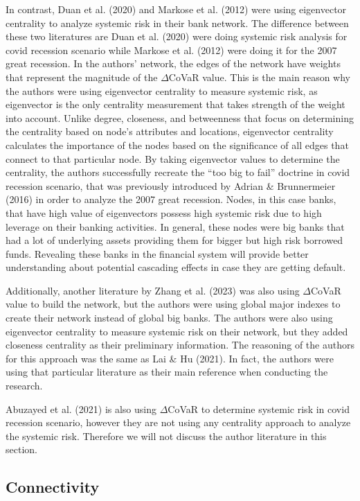 \documentclass[a4paper,11pt]{article}
\begin{document}
In contrast, Duan et al. (2020) and Markose et al. (2012) were using eigenvector centrality to analyze systemic risk in their bank network. The difference between these two literatures are Duan et al. (2020) were doing systemic risk analysis for covid recession scenario while Markose et al. (2012) were doing it for the 2007 great recession. In the authors’ network, the edges of the network have weights that represent the magnitude of the  $\Delta$CoVaR value. This is the main reason why the authors were using eigenvector centrality to measure systemic risk, as eigenvector is the only centrality measurement that takes strength of the weight into account. Unlike degree, closeness, and betweenness that focus on determining the centrality based on node’s attributes and locations, eigenvector centrality calculates the importance of the nodes based on the significance of all edges that connect to that particular node. By taking eigenvector values to determine the centrality, the authors successfully recreate the “too big to fail” doctrine in covid recession scenario, that was previously introduced by Adrian \& Brunnermeier (2016) in order to analyze the 2007 great recession. Nodes, in this case banks, that have high value of eigenvectors possess high systemic risk due to high leverage on their banking activities. In general, these nodes were big banks that had a lot of underlying assets providing them for bigger but high risk borrowed funds. Revealing these banks in the financial system will provide better understanding about potential cascading effects in case they are getting default. 

Additionally, another literature by Zhang et al. (2023) was also using  $\Delta$CoVaR value to build the network, but the authors were using global major indexes to create their network instead of global big banks. The authors were also using eigenvector centrality to measure systemic risk on their network, but they added closeness centrality as their preliminary information. The reasoning of the authors for this approach was the same as Lai \& Hu (2021). In fact, the authors were using that particular literature as their main reference when conducting the research.

Abuzayed et al. (2021) is also using  $\Delta$CoVaR to determine systemic risk in covid recession scenario, however they are not using any centrality approach to analyze the systemic risk. Therefore we will not discuss the author literature in this section.
\subsection{Connectivity}
\end{document}
